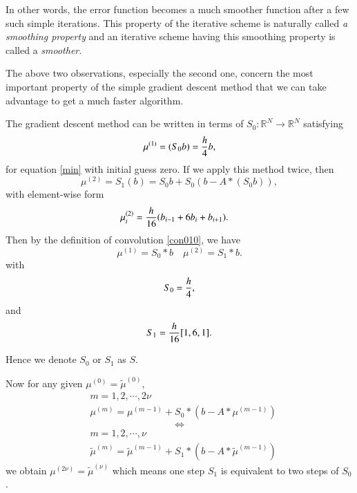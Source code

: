 In other words, the error function becomes a much smoother function
after a few such simple iterations.  This property of the iterative
scheme is naturally called {\it a smoothing property} and an iterative
scheme having this smoothing property is called a {\it smoother}.

The above two observations, especially the second one, concern the
most important property of the simple gradient descent method that we can
take advantage to get a much faster algorithm.


The gradient descent method can be written in terms of $S_{0}:\mathbb R^{N}\rightarrow \mathbb R^{N}$ satisfying
\begin{equation}
\label{jacobi1d}
\mu^{(1)}=(S_{0}b)={h\over 4} b,
\end{equation}
for equation \eqref{min} with initial guess zero.
If we apply this method twice, then
$$
\mu^{(2)}=S_1(b) = S_{0} b + S_0(b - A\ast(S_{0}b)),
$$
with element-wise form
\begin{equation} 
\begin{aligned}
\mu^{(2)}_{i} &={h\over 16}(b_{i-1}+6b_i+b_{i+1}).
\end{aligned}
\end{equation}
Then by the definition of convolution \eqref{con010}, we have
 \begin{equation}\label{eq:convS}
\mu^{(1)}= S_{0}\ast b \quad \mu^{(2)} = S_1 \ast b.
\end{equation}
with
\begin{equation}\label{eq:kernel-S1d}
S_{0} = {h\over 4},
\end{equation}
and 
\begin{equation}\label{eq:kernel-S2}
S_1={h\over 16}[1,6,1].
\end{equation} 

Hence we denote $S_0$ or $S_1$ as $S$.

Now for any given $\mu^{(0)}=\tilde{\mu}^{(0)}$, 
\begin{equation}
\begin{aligned}
&m=1,2,\cdots,2\nu\\
&\mu^{(m)}=\mu^{(m-1)}+S_0\ast(b-A\ast\mu^{(m-1)})
\end{aligned}
\end{equation}
$$\Leftrightarrow$$
\begin{equation}
\begin{aligned}
&m=1,2,\cdots,\nu\\
&\tilde{\mu}^{(m)}=\tilde{\mu}^{(m-1)}+S_1\ast(b-A\ast\tilde{\mu}^{(m-1)})
\end{aligned}
\end{equation}
we obtain $\mu^{(2\nu)}=\tilde{\mu}^{(\nu)}$ which means one step $S_1$ is equivalent to two steps of $S_0$.

